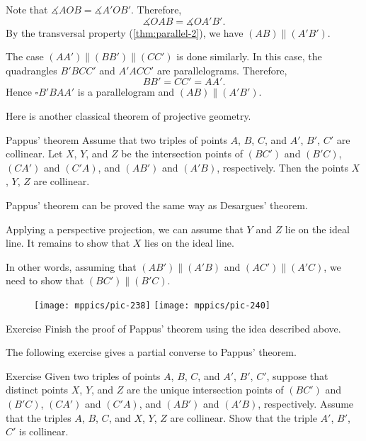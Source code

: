 Note that $\measuredangle AOB=\measuredangle A'OB'$.
Therefore, 
\[\measuredangle OAB=\measuredangle OA'B'.\]
By the transversal property (\ref{thm:parallel-2}), we have
$(AB)\parallel (A'B')$.

The case $(AA')\parallel(BB')\parallel(CC')$ is done similarly.
In this case, the quadrangles $B'BCC'$ and $A'ACC'$ are parallelograms.
Therefore, 
\[BB'=CC'=AA'.\]
Hence $\square B'BAA'$ is a parallelogram and $(AB)\parallel (A'B')$.
\qeds




Here is another classical theorem of projective geometry.

\begin{thm}{Pappus' theorem}\label{thm:pappus}
Assume that two triples of points $A$, $B$, $C$,
and $A'$, $B'$, $C'$ are collinear.
Let $X$, $Y$, and $Z$ be the intersection points of $(BC')$ and $(B'C)$, $(CA')$ and $(C'A)$,
and $(AB')$ and $(A'B)$, respectively.
Then the points $X$, $Y$, $Z$ are collinear.
\end{thm}


Pappus' theorem can be proved the same way as Desargues' theorem.

Applying a perspective projection, we can assume that $Y$ and $Z$ lie on the ideal line.
It remains to show that $X$ lies on the ideal line.

In other words, assuming that $(AB')\parallel (A'B)$ and $(AC')\parallel (A'C)$, we need to show that $(BC')\parallel(B'C)$.

\begin{figure}[!ht]
\centering
\texttt{[image: mppics/pic-238]}
\hskip15mm
\texttt{[image: mppics/pic-240]}
\end{figure}


\begin{thm}{Exercise}\label{ex:pappus}
Finish the proof of Pappus' theorem using the idea described above.
\end{thm}

The following exercise gives a partial converse to Pappus' theorem.

\begin{thm}{Exercise}\label{ex:pappus-converse}
Given two triples of points $A$, $B$, $C$,
and $A'$, $B'$, $C'$,
suppose that distinct points $X$, $Y$, and $Z$ are the unique intersection points of $(BC')$ and $(B'C)$, $(CA')$ and $(C'A)$,
and $(AB')$ and $(A'B)$, respectively.
Assume that the triples $A$, $B$, $C$,
and $X$, $Y$, $Z$ are collinear.
Show that the triple $A'$, $B'$, $C'$ is collinear.
\end{thm}

